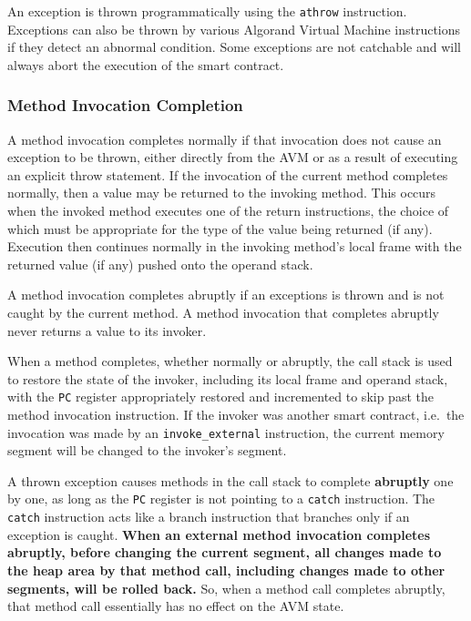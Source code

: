 \documentclass[11pt, A4]{report}
\begin{document}
    An exception is thrown programmatically using the \texttt{athrow} instruction. Exceptions can also be thrown by
    various Algorand Virtual Machine instructions if they detect an abnormal condition. Some exceptions are not
    catchable and will always abort the execution of the smart contract.

    \subsubsection{Method Invocation Completion}

    A method invocation completes normally if that invocation does not cause an exception to be thrown, either
    directly from the AVM or as a result of executing an explicit throw statement. If the invocation of the current
    method completes normally, then a value may be returned to the invoking method. This occurs when the invoked
    method executes one of the return instructions, the choice of which must be appropriate for the type of the value
    being returned (if any). Execution then continues normally in the invoking method's local frame with the returned
    value (if any) pushed onto the operand stack.

    A method invocation completes abruptly if an exceptions is thrown and is not caught by the current method. A
    method invocation that completes abruptly never returns a value to its invoker.

    When a method completes, whether normally or abruptly, the call stack is used to restore the state of the invoker,
    including its local frame and operand stack, with the \texttt{PC} register appropriately restored and incremented
    to skip past the method invocation instruction. If the invoker was another smart contract, i.e.\ the invocation
    was made by an \texttt{invoke\_external} instruction, the current memory segment will be changed to the invoker's
    segment.

    A thrown exception causes methods in the call stack to complete \textbf{abruptly} one by one, as long as the
    \texttt{PC} register is not pointing to a \texttt{catch} instruction. The \texttt{catch} instruction acts like a
    branch instruction that branches only if an exception is caught. \textbf{When an external method invocation
    completes abruptly, before changing the current segment, all changes made to the heap area by that method
    call, including changes made to other segments, will be rolled back.} So, when a method call completes abruptly,
    that method call essentially has no effect on the AVM state.
\end{document}
